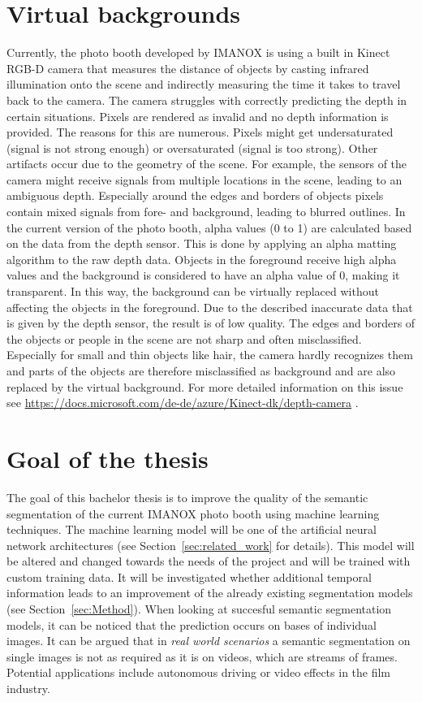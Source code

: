 \documentclass[11pt,
  paper=a4, 
  bibliography=totocnumbered,
	captions=tableheading,
	BCOR=10mm
]{scrreprt}
\theoremstyle{definition}
\begin{document}
\section{Virtual backgrounds}
Currently, the photo booth developed by IMANOX is using a built in Kinect RGB-D camera that measures the distance of objects by casting infrared illumination onto the scene and indirectly measuring the time it takes to travel back to the camera. 
The camera struggles with correctly predicting the depth in certain situations. 
Pixels are rendered as invalid and no depth information is provided. 
The reasons for this are numerous. 
Pixels might get undersaturated (signal is not strong enough) or oversaturated (signal is too strong). 
Other artifacts occur due to the geometry of the scene. 
For example, the sensors of the camera might receive signals from multiple locations in the scene, leading to an ambiguous depth. 
Especially around the edges and borders of objects pixels contain mixed signals from fore- and background, leading to blurred outlines.
In the current version of the photo booth, alpha values (0 to 1) are calculated based on the data from the depth sensor. 
This is done by applying an alpha matting algorithm \cite{Gastal2010} to the raw depth data.
Objects in the foreground receive high alpha values and the background is considered to have an alpha value of 0, making it transparent. 
In this way, the background can be virtually replaced without affecting the objects in the foreground. 
Due to the described inaccurate data that is given by the depth sensor, the result is of low quality. 
The edges and borders of the objects or people in the scene are not sharp and often misclassified. 
Especially for small and thin objects like hair, the camera hardly recognizes them and parts of the objects are therefore misclassified as background and are also replaced by the virtual background.
For more detailed information on this issue see \url{https://docs.microsoft.com/de-de/azure/Kinect-dk/depth-camera} \cite{Microsoft2019}.

\section{Goal of the thesis}
The goal of this bachelor thesis is to improve the quality of the semantic segmentation of the current IMANOX photo booth using machine learning techniques.
The machine learning model will be one of the artificial neural network architectures (see Section~\ref{sec:related_work} for details).
This model will be altered and changed towards the needs of the project and will be trained with custom training data.
It will be investigated whether additional temporal information leads to an improvement of the already existing segmentation models (see Section~\ref{sec:Method}).
When looking at succesful semantic segmentation models, it can be noticed that the prediction occurs on bases of individual images.
It can be argued that in \textit{real world scenarios} a semantic segmentation on single images is not as required as it is on videos, which are streams of frames.
Potential applications include autonomous driving or video effects in the film industry.
\end{document}
